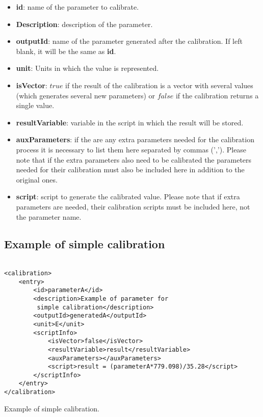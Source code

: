 \begin{itemize}
\item \textbf{id}: name of the parameter to calibrate.
\item \textbf{Description}: description of the parameter.
\item \textbf{outputId}: name of the parameter generated after the calibration. If left blank, it will be the same as \textbf{id}.
\item \textbf{unit}: Units in which the value is represented.
\item \textbf{isVector}: $true$ if the result of the calibration is a vector with several values (which generates several new parameters) or $false$ if the calibration returns a single value.
\item \textbf{resultVariable}: variable in the script in which the result will be stored.
\item \textbf{auxParameters}: if the are any extra parameters needed for the calibration process it is necessary to list them here separated by commas (','). Please note that if the extra parameters also need to be calibrated the parameters needed for their calibration must also be included here in addition to the original ones.
\item \textbf{script}: script to generate the calibrated value. Please note that if extra parameters are needed, their calibration scripts must be included here, not the parameter name. 
\end{itemize}

\subsection{Example of simple calibration}

\begin{table}[H]
\lstset{language=XML}
\begin{lstlisting}

<calibration>
	<entry>
		<id>parameterA</id>
		<description>Example of parameter for
		 simple calibration</description>
		<outputId>generatedA</outputId> 
		<unit>E</unit>
		<scriptInfo>
			<isVector>false</isVector>
			<resultVariable>result</resultVariable>
			<auxParameters></auxParameters>
			<script>result = (parameterA*779.098)/35.28</script>
		</scriptInfo>
	</entry>
</calibration>
\end{lstlisting}
\caption{Example of simple calibration.}
\label{Table5.7}
\end{table}

